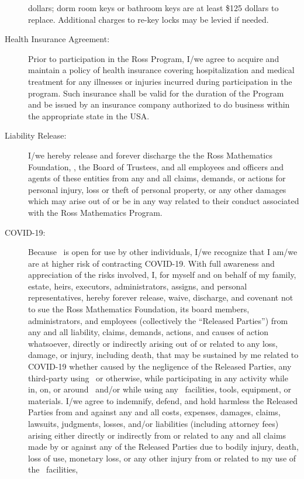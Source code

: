 \documentclass{ross}
\begin{document}
\begin{description}
dollars; dorm room keys or bathroom keys are at least \$125 dollars to
replace.  Additional charges to re-key locks may be levied if needed.
\item[Health Insurance Agreement:] Prior to participation in the Ross
  Program, I/we agree to acquire and maintain a policy of health
  insurance covering hospitalization and medical treatment for any
  illnesses or injuries incurred during participation in the
  program. Such insurance shall be valid for the duration of the
  Program and be issued by an insurance company authorized to do
  business within the appropriate state in the USA.
\item[Liability Release:] I/we hereby release and forever discharge
  the the Ross Mathematics Foundation, 
  \campus, the Board  of Trustees, and 
  all employees and officers and agents of these entities from any
  and all claims, demands, or actions for personal injury, loss or
  theft of personal property, or any other damages which may arise out
  of or be in any way related to their conduct associated with the
  Ross Mathematics Program.
  \item[COVID-19:] Because \campus\ is open for use
by other individuals, I/we recognize that I am/we are at higher risk of contracting COVID-19. With full awareness and appreciation of
the risks involved, I, for myself and on behalf of my family, estate, heirs, executors, administrators, assigns, and
personal representatives, hereby forever release, waive, discharge, and covenant not to sue the Ross Mathematics Foundation, its
board members, administrators, and employees (collectively the  ``Released Parties'') from
any and all liability, claims, demands, actions, and causes of action whatsoever, directly or indirectly arising out of or
related to any loss, damage, or injury, including death, that may be sustained by me related to COVID-19 whether
caused by the negligence of the Released Parties, any third-party using \campus\, or otherwise, while
participating in any activity while in, on, or around \campus\ and/or while using any \campus\
facilities, tools, equipment, or materials. I/we agree to indemnify, defend, and hold harmless the Released Parties from and against any and all costs, expenses,
damages, claims, lawsuits, judgments, losses, and/or liabilities (including attorney fees) arising either directly or
indirectly from or related to any and all claims made by or against any of the Released Parties due to bodily injury,
death, loss of use, monetary loss, or any other injury from or related to my use of the \campus\ facilities,

\end{description}
\end{document}
